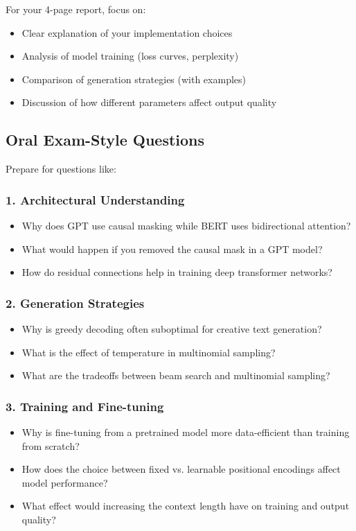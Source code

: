 For your 4-page report, focus on:

\begin{itemize}
    \item Clear explanation of your implementation choices
    \item Analysis of model training (loss curves, perplexity)
    \item Comparison of generation strategies (with examples)
    \item Discussion of how different parameters affect output quality
\end{itemize}

\subsection*{Oral Exam-Style Questions}

Prepare for questions like:

\subsubsection*{1. Architectural Understanding}
\begin{itemize}
    \item Why does GPT use causal masking while BERT uses bidirectional attention?
    \item What would happen if you removed the causal mask in a GPT model?
    \item How do residual connections help in training deep transformer networks?
\end{itemize}

\subsubsection*{2. Generation Strategies}
\begin{itemize}
    \item Why is greedy decoding often suboptimal for creative text generation?
    \item What is the effect of temperature in multinomial sampling?
    \item What are the tradeoffs between beam search and multinomial sampling?
\end{itemize}

\subsubsection*{3. Training and Fine-tuning}
\begin{itemize}
    \item Why is fine-tuning from a pretrained model more data-efficient than training from scratch?
    \item How does the choice between fixed vs. learnable positional encodings affect model performance?
    \item What effect would increasing the context length have on training and output quality?
\end{itemize}

